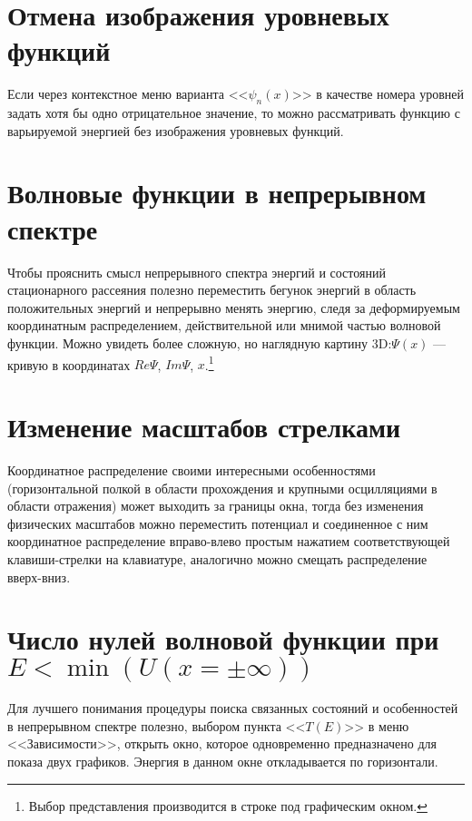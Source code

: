 \documentclass[12pt]{article}
\begin{document}
\hypertarget{ErasePsin}{}\section{Отмена изображения уровневых функций}
Если через контекстное меню варианта <<$\psi_n(x)$>> в качестве номера уровней задать
хотя бы одно отрицательное значение, то можно рассматривать  функцию с варьируемой энергией
без изображения уровневых функций.

\hypertarget{psixE}{}\section[Волновые функции в непрерывном спектре]{Волновые функции в непрерывном спектре}
Чтобы прояснить смысл непрерывного спектра энергий и
состояний стационарного рассеяния полезно
переместить бегунок энергий в область положительных энергий и непрерывно менять энергию, следя за
деформируемым координатным распределением, действительной или мнимой частью волновой функции. Можно увидеть более сложную, но наглядную картину 3D:$\Psi(x)$ --- кривую в координатах $Re\Psi$, $Im\Psi$, $x$.\footnote[8]{Выбор представления производится в строке под графическим окном.}

\hypertarget{ScaleChanged}{}\section{Изменение масштабов стрелками}
Координатное распределение своими интересными особенностями (горизонтальной полкой в
области прохождения и крупными осцилляциями в области отражения) может выходить за границы окна,
тогда без изменения физических масштабов можно переместить потенциал и соединенное с ним координатное
распределение вправо-влево простым нажатием соответствующей клавиши-стрелки на клавиатуре, аналогично
можно смещать распределение вверх-вниз.


\hypertarget{zerosOfPsin}{}\section [Число нулей волновой функции]{Число нулей  волновой функции при $E<\min(U(x=\pm\infty))$}
Для лучшего понимания процедуры поиска связанных состояний и особенностей в
непрерывном спектре полезно, выбором пункта <<$T(E)$>> в меню <<Зависимости>>,
открыть окно, которое одновременно предназначено для показа двух графиков.
Энергия в данном окне откладывается по горизонтали.
\end{document}
